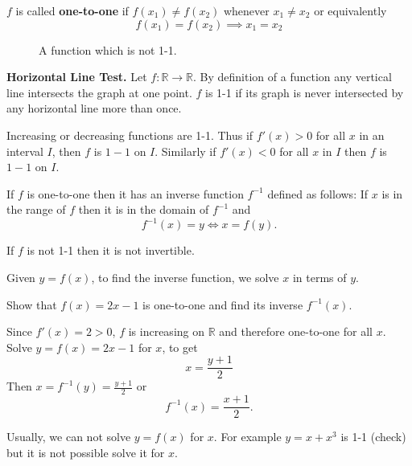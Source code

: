 \documentclass[calc1-main.tex]{subfiles}
\begin{document}
  \begin{definition}
    $f$ is called \textbf{one-to-one} if $f(x_1) \neq f(x_2)$ whenever $x_1 \neq x_2$ or equivalently
    \[
      f(x_1) = f(x_2) \implies x_1 = x_2
    \]
  \end{definition}

  \begin{figure}[H]
   \centering
   
   \caption{A function which is not 1-1.}
 \end{figure}

 \textbf{Horizontal Line Test.}
 Let $f: \mathbb{R} \to \mathbb{R}$. By definition of a function any vertical line intersects the graph at one point. $f$ is 1-1 if its graph is never intersected by any horizontal line more than once.

 \begin{theorem}
  Increasing or decreasing functions are 1-1. Thus if $f'(x)>0$ for all $x$ in an interval $I$, then $f$ is $1-1$ on $I$. Similarly if $f'(x)<0$ for all $x$ in $I$ then $f$ is $1-1$ on $I$.
\end{theorem}

\begin{definition}
  If $f$ is one-to-one then it has an inverse function $f^{-1}$ defined as follows: If $x$ is in the range of $f$ then it is in the domain of $f^{-1}$ and
  \[
    f^{-1}(x) = y \iff x = f(y).
  \]
\end{definition}
If $f$ is not 1-1 then it is not invertible.

Given $y=f(x)$, to find the inverse function, we solve $x$ in terms of $y$.
\begin{example}
  Show that $f(x) = 2x -1$ is one-to-one and find its inverse $f^{-1}(x)$.
\end{example}
\begin{solution}
  Since $f'(x) = 2 >0$, $f$ is increasing on $\mathbb{R}$ and therefore one-to-one for all $x$. Solve $y=f(x) = 2x-1$ for $x$, to get
  \[
    x = \frac{y+1}{2}
  \]
  Then $x = f^{-1}(y) = \frac{y+1}{2}$ or
  \[
    f^{-1}(x) = \frac{x+1}{2}.
  \]
\end{solution}

Usually, we can not solve $y=f(x)$ for $x$. For example $y=x+x^3$ is 1-1 (check) but it is not possible solve it for $x$.
\end{document}
